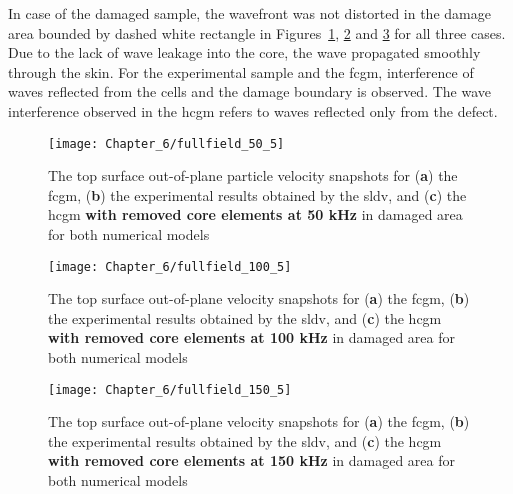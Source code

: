 In case of the damaged sample, the wavefront was not distorted in the damage area bounded by dashed white rectangle in Figures~\ref{fig:fullfield_50_5}, \ref{fig:fullfield_100_5} and \ref{fig:fullfield_150_5} for all three cases.
Due to the lack of wave leakage into the core, the wave propagated smoothly through the skin.
For the experimental sample and the \ac{fcgm}, interference of waves reflected from the cells and the damage boundary is observed.
The wave interference observed in the \ac{hcgm} refers to waves reflected only from the defect.

\begin{figure}[!hbt]
	\begin{center}
		\texttt{[image: Chapter\_6/fullfield\_50\_5]}
	\end{center}
	\caption{The top surface out-of-plane particle velocity snapshots for (\textbf{a}) the \acf{fcgm}, (\textbf{b}) the experimental results obtained by the \acf{sldv}, and (\textbf{c}) the \acf{hcgm} \textbf{with removed core elements at 50 kHz} in damaged area for both numerical models}
	\label{fig:fullfield_50_5}
\end{figure}
\begin{figure}[!hbt]
	\begin{center}
		\texttt{[image: Chapter\_6/fullfield\_100\_5]}
	\end{center}
	\caption{The top surface out-of-plane velocity snapshots for (\textbf{a}) the \acf{fcgm}, (\textbf{b}) the experimental results obtained by the \acf{sldv}, and (\textbf{c}) the \acf{hcgm} \textbf{with removed core elements at 100 kHz} in damaged area for both numerical models}
	\label{fig:fullfield_100_5}
\end{figure}
\begin{figure}[!hbt]
	\begin{center}
		\texttt{[image: Chapter\_6/fullfield\_150\_5]}
	\end{center}
	\caption{The top surface out-of-plane velocity snapshots for (\textbf{a}) the \acf{fcgm}, (\textbf{b}) the experimental results obtained by the \acf{sldv}, and (\textbf{c}) the \acf{hcgm} \textbf{with removed core elements at 150 kHz} in damaged area for both numerical models}
	\label{fig:fullfield_150_5}
\end{figure}
\clearpage